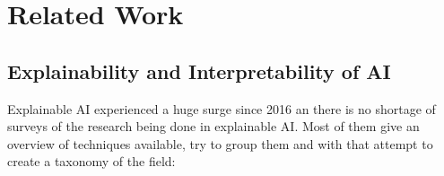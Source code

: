 \documentclass[manuscript,screen,review]{acmart}
\begin{document}
\section{Related Work}\label{sec:related-work}
%
%


\subsection{Explainability and Interpretability of AI}\label{subsec:explainability-and-interpretability}
Explainable AI experienced a huge surge since 2016 an there is no shortage of surveys of the research being done in
explainable AI.
Most of them give an overview of techniques available, try to group them and with that attempt to create a taxonomy of the field:
\end{document}
